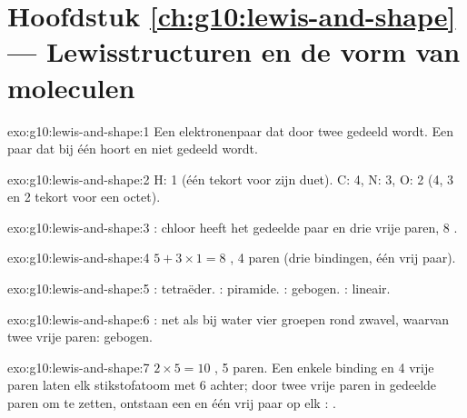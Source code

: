 \section*{Hoofdstuk \ref{ch:g10:lewis-and-shape} --- Lewisstructuren en de vorm van moleculen}

\begin{solution}{exo:g10:lewis-and-shape:1}
Een elektronenpaar dat door twee  gedeeld wordt. Een paar
 dat bij één  hoort en niet gedeeld wordt.
\end{solution}

\begin{solution}{exo:g10:lewis-and-shape:2}
H: 1 (één  tekort voor zijn duet). C: 4, N: 3, O: 2 (4, 3 en 2
 tekort voor een octet).
\end{solution}

\begin{solution}{exo:g10:lewis-and-shape:3}
: chloor heeft het gedeelde paar en drie vrije
paren, 8 .
\end{solution}

\begin{solution}{exo:g10:lewis-and-shape:4}
$5 + 3 \times 1 = 8$ , 4 paren (drie bindingen, één vrij paar).
\end{solution}

\begin{solution}{exo:g10:lewis-and-shape:5}
: tetraëder. : piramide. : gebogen. :
lineair.
\end{solution}

\begin{solution}{exo:g10:lewis-and-shape:6}
: net als bij water vier groepen rond zwavel,
waarvan twee vrije paren: gebogen.
\end{solution}

\begin{solution}{exo:g10:lewis-and-shape:7}
$2 \times 5 = 10$ , 5 paren. Een enkele binding en 4 vrije paren
laten elk stikstofatoom met 6  achter; door twee vrije paren in
gedeelde paren om te zetten, ontstaan een  en één vrij
paar op elk :
.
\end{solution}

